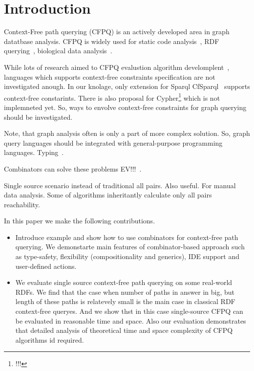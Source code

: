 \section{Introduction}

Context-Free path querying (CFPQ) is an actively developed area in graph datatbase analysis.
CFPQ is widely used for static code analysis~\cite{!!!}, RDF querying~\cite{!!!}, biological data analysis~\cite{!!!}.

While lots of research aimed to CFPQ evalustion algorithm develomplent~\cite{!!!}, languages which supports context-free constraints specification are not investigated anough.
In our knolage, only extension for Sparql CfSparql~\cite{!!!} supports context-free constarints.
There is also proposal for Cypher\footnote{!!!} which is not implemneted yet.
So, ways to envolve context-free constraints for graph querying should be investigated.

Note, that graph analysis often is only a part of more complex solution.
So, graph query languages should be integrated with general-purpose programming languages.
Typing~\cite{10.1145/2076623.2076653}.

Combinators can solve these problems{\huge{ EV!!!}}~\cite{10.1145/3241653.3241655}.

Single source scenario instead of traditional all pairs.
Also useful.
For manual data analysis.
Some of algorithms inheritantly calculate only all pairs reachability.

In this paper we make the following contributions.
\begin{itemize}
  \item Introduce example and show how to use combinators for context-free path querying.
  We demonstarte main features of combinator-based approach such as type-safety, flexibility (compositionality and generics), IDE support and user-defined actions.
  \item We evaluate single source context-free path querying on some real-world RDFs.
  We find that the case when number of paths in answer in big, but length of these paths is relatevely small is the main case in classical RDF context-free queryes.
  And we show thst in this case single-source CFPQ can be evaluated in reasonable time and space.
  Also our evaluation demonstrates that detailed analysis of theoretical time and space complexity of CFPQ algorithms id required.
\end{itemize}
